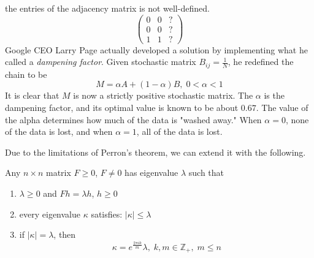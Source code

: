   \begin{figure}[H]
    \centering 
    \label{fig:degenerate_markov_chain}
  \end{figure}
  the entries of the adjacency matrix is not well-defined. 
  \begin{equation}
     \begin{pmatrix} 0&0&? \\0&0&? \\1&1&?\end{pmatrix}
  \end{equation}
  Google CEO Larry Page actually developed a solution by implementing what he called a \textit{dampening factor}. Given stochastic matrix $B_{i j} = \frac{1}{N}$, he redefined the chain to be 
  \begin{equation}
    M = \alpha A + (1-\alpha) B, \; 0< \alpha < 1
  \end{equation}
  It is clear that $M$ is now a strictly positive stochastic matrix. The $\alpha$ is the dampening factor, and its optimal value is known to be about $0.67$. The value of the alpha determines how much of the data is "washed away." When $\alpha = 0$, none of the data is lost, and when $\alpha = 1$, all of the data is lost. 

  Due to the limitations of Perron's theorem, we can extend it with the following.

  \begin{theorem}
  Any $n \times n$ matrix $F \geq 0$, $F \neq 0$ has eigenvalue $\lambda$ such that
  \begin{enumerate}
      \item $\lambda \geq 0$ and $F h = \lambda h$, $h\geq 0$ \item every eigenvalue $\kappa$ satisfies: $|\kappa| \leq \lambda$ 
      \item if $|\kappa| = \lambda$, then 
      \begin{equation}
        \kappa = e^{\frac{2 \pi i k}{m}} \lambda, \; k, m \in \mathbb{Z}_+, \; m \leq n
      \end{equation}
  \end{enumerate}
  \end{theorem}

